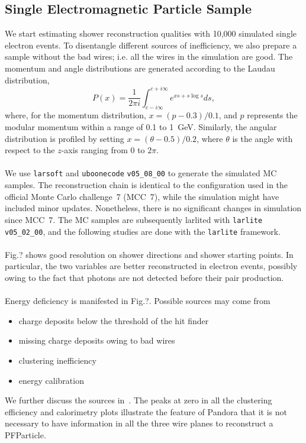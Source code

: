 \subsection{Single Electromagnetic Particle Sample}
\label{sec:single_em}

We start estimating shower reconstruction qualities with 10,000 simulated
single electron events.
To disentangle different sources of inefficiency, we also prepare a sample
without the bad wires; 
i.e. all the wires in the simulation are good.
The momentum and angle distributions are generated according to
the Laudau distribution,
\begin{equation}
\label{eq:bnb-like}
P(x) = \frac{1}{2\pi i}\int^{c+i\infty}_{c-i\infty}e^{xs+s\log s}ds,
\end{equation}
where, for the momentum distribution, $x = (p-0.3)/0.1$, and $p$ 
represents the modular momentum within a range of 0.1 to 1~GeV.
Similarly, the angular distribution is profiled by setting 
$x = (\theta-0.5)/0.2$,
where $\theta$ is the angle with respect to the $z$-axis ranging from
0 to $2\pi$. \\
\\
We use \texttt{larsoft} and \texttt{uboonecode} \texttt{v05\_08\_00} to
generate the simulated MC samples.
The reconstruction chain is identical to the configuration used in 
the official Monte Carlo challenge~7 (MCC~7), while the simulation 
might have included minor updates.
Nonetheless, there is no significant changes in simulation
since MCC~7.
The MC samples are subsequently larlited with \texttt{larlite} 
\texttt{v05\_02\_00}, and the following studies are done with the
\texttt{larlite} framework.\\
\\
Fig.? shows good resolution on shower directions and shower starting
points.
In particular, the two variables are better reconstructed in
electron events, possibly owing to the fact that photons are
not detected before their pair production.\\
\\
Energy deficiency is manifested in Fig.?.
Possible sources may come from
\begin{itemize}
\item charge deposits below the threshold of the hit finder
\item missing charge deposits owing to bad wires
\item clustering inefficiency
\item energy calibration
\end{itemize}
We further discuss the sources in~. 
The peaks at zero in all the clustering efficiency and calorimetry
plots illustrate the feature of Pandora that it is not necessary to
have information in all the three wire planes to reconstruct a 
PFParticle.


